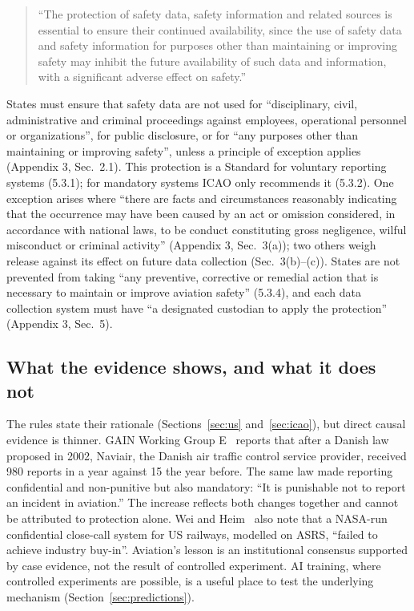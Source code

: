 \documentclass[review,12pt]{elsarticle}
\begin{document}
\begin{quote}
``The protection of safety data, safety information and related sources is essential to ensure their continued availability, since the use of safety data and safety information for purposes other than maintaining or improving safety may inhibit the future availability of such data and information, with a significant adverse effect on safety.'' \cite[Appendix~3, Note~1]{icao2016}
\end{quote}

States must ensure that safety data are not used for ``disciplinary, civil, administrative and criminal proceedings against employees, operational personnel or organizations'', for public disclosure, or for ``any purposes other than maintaining or improving safety'', unless a principle of exception applies (Appendix 3, Sec.~2.1). This protection is a Standard for voluntary reporting systems (5.3.1); for mandatory systems ICAO only recommends it (5.3.2). One exception arises where ``there are facts and circumstances reasonably indicating that the occurrence may have been caused by an act or omission considered, in accordance with national laws, to be conduct constituting gross negligence, wilful misconduct or criminal activity'' (Appendix 3, Sec.~3(a)); two others weigh release against its effect on future data collection (Sec.~3(b)--(c)). States are not prevented from taking ``any preventive, corrective or remedial action that is necessary to maintain or improve aviation safety'' (5.3.4), and each data collection system must have ``a designated custodian to apply the protection'' (Appendix 3, Sec.~5).

\subsection{What the evidence shows, and what it does not}\label{sec:evidence}

The rules state their rationale (Sections~\ref{sec:us} and~\ref{sec:icao}), but direct causal evidence is thinner. GAIN Working Group E~\cite[Sec.~4.1]{gain2004} reports that after a Danish law proposed in 2002, Naviair, the Danish air traffic control service provider, received 980 reports in a year against 15 the year before. The same law made reporting confidential and non-punitive but also mandatory: ``It is punishable not to report an incident in aviation.'' The increase reflects both changes together and cannot be attributed to protection alone. Wei and Heim~\cite{weiheim2026} also note that a NASA-run confidential close-call system for US railways, modelled on ASRS, ``failed to achieve industry buy-in''. Aviation's lesson is an institutional consensus supported by case evidence, not the result of controlled experiment. AI training, where controlled experiments are possible, is a useful place to test the underlying mechanism (Section~\ref{sec:predictions}).
\end{document}
